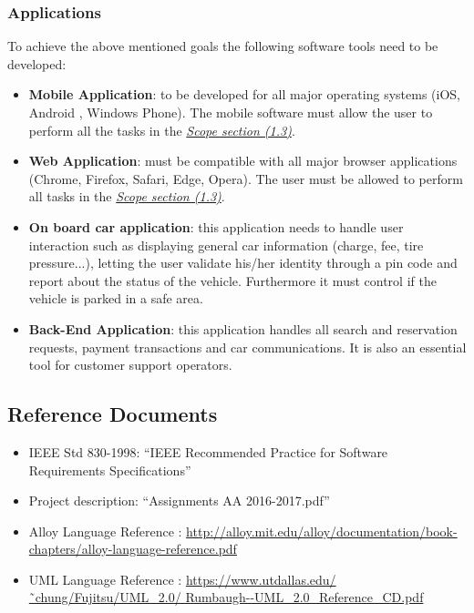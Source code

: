 \documentclass[12pt]{article}
\begin{document}
	
	\subsubsection{Applications}
		To achieve the above mentioned goals the following software tools need to be developed:
	
	\begin{itemize}
		\item \textbf{Mobile Application}: to be developed for all major operating systems 
					 (iOS, Android , Windows Phone). The mobile software must allow the user 
					 to perform all the tasks in the \hyperref[scope:1]{\textit{Scope section 
					 (1.3)}}.
		\item \textbf{Web Application}: must be compatible with all major browser applications (Chrome, Firefox, Safari, Edge, Opera). 
					 The user must be allowed to perform all tasks in  the \hyperref[scope:1]
					 {\textit{Scope section (1.3)}}.
		\item \textbf{ On board car application}: this application needs to handle user 
					 interaction such as displaying general car information (charge, fee, tire 
					 pressure...), letting the user validate his/her identity through a pin 
					 code and report about the status of the vehicle. 
					 Furthermore it must control if the vehicle is parked in a safe area.
		\item \textbf{ Back-End Application}: this application handles all search and 
					 reservation requests, payment transactions and car communications. It is
					 also an essential tool for customer support operators.
	\end{itemize}
		
	\subsection{Reference Documents}
	\begin{itemize}
		\item IEEE Std 830-1998: “IEEE Recommended Practice for Software Requirements 	
			  Specifications”
	 	\item Project description: “Assignments AA 2016-2017.pdf”
	 	\item Alloy Language Reference : \url{http://alloy.mit.edu/alloy/documentation/book-	
	 		  chapters/alloy-language-reference.pdf}
	 	\item UML Language Reference : \url{https://www.utdallas.edu/˜chung/Fujitsu/UML_2.0/
	 		  Rumbaugh--UML_2.0_Reference_CD.pdf}
	\end{itemize}
	
\end{document}
